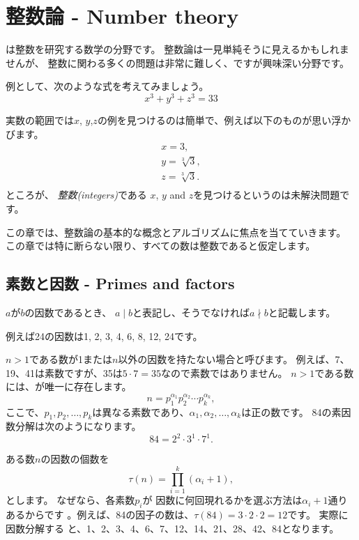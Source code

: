 \chapter{整数論 - Number theory}


は整数を研究する数学の分野です。
整数論は一見単純そうに見えるかもしれませんが、
整数に関わる多くの問題は非常に難しく、ですが興味深い分野です。

例として、次のような式を考えてみましょう。
\[x^3 + y^3 + z^3 = 33\]

実数の範囲では$x$, $y$,$z$の例を見つけるのは簡単で、例えば以下のものが思い浮かびます。
\[
\begin{array}{lcl}
x = 3, \\
y = \sqrt[3]{3}, \\
z = \sqrt[3]{3}.\\
\end{array}
\]
ところが、
\emph{整数(integers)}である $x$, $y$ and $z$を見つけるというのは未解決問題です。\cite{bec07}

この章では、整数論の基本的な概念とアルゴリズムに焦点を当てていきます。
この章では特に断らない限り、すべての数は整数であると仮定します。

\section{素数と因数 - Primes and factors}



$a$が$b$の因数であるとき、 $a \mid b$と表記し、そうでなければ$a \nmid b$と記載します。

例えば24の因数は1, 2, 3, 4, 6, 8, 12, 24です。


$n>1$である数が1または$n$以外の因数を持たない場合と呼びます。
例えば、7、19、41は素数ですが、35は$5 \cdot 7 = 35$なので素数ではありません。
$n>1$である数には、が唯一に存在します。
\[ n = p_1^{\alpha_1} p_2^{\alpha_2} \cdots p_k^{\alpha_k},\]
ここで、$p_1,p_2,\ldots,p_k$は異なる素数であり、$\alpha_1,\alpha_2,\ldots,\alpha_k$は正の数です。
84の素因数分解は次のようになります。
\[84 = 2^2 \cdot 3^1 \cdot 7^1.\]

ある数$n$の因数の個数を
\[\tau(n)=\prod_{i=1}^k (\alpha_i+1),\]
とします。
なぜなら、各素数$p_i$が
因数に何回現れるかを選ぶ方法は$\alpha_i+1$通りあるからです
。例えば、84の因子の数は、$\tau(84)=3 \cdot 2 \cdot 2 = 12$です。
実際に因数分解する と、1、2、3、4、6、7、12、14、21、28、42、84となります。

